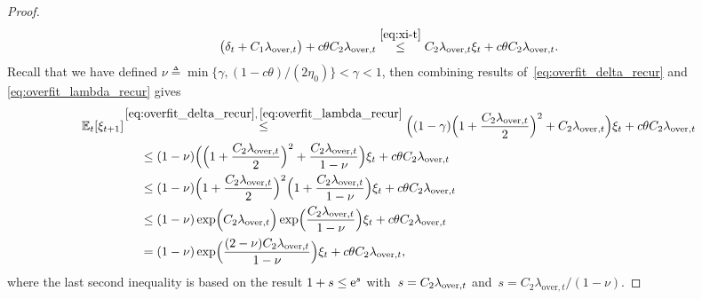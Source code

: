\documentclass[11pt]{article}
\theoremstyle{plain}
\theoremstyle{definition}
\theoremstyle{remark}
\theoremstyle{plain}
\begin{document}
\begin{proof}
\begin{align}
\begin{split}
\bigl(\delta_t+C_1\lambda_{\mathrm{over},t}\bigr)
+c\theta C_2\lambda_{\mathrm{over},t}  
 \overset{\eqref{eq:xi-t}}\leq C_2\lambda_{\mathrm{over},t}\xi_t
+c\theta C_2\lambda_{\mathrm{over},t}.
\end{split}
\end{align}
Recall that we have defined $\nu\triangleq\min\{\gamma,(1-c\theta)/(2\eta_0)\}<\gamma<1$, then combining results of~\eqref{eq:overfit_delta_recur} and \eqref{eq:overfit_lambda_recur} gives
\begin{subequations}
\begin{align}
\label{eq:xi_one_step_over_raw}
\mathbb E_t[\xi_{t+1}]
&\!\overset{\eqref{eq:overfit_delta_recur},\,\eqref{eq:overfit_lambda_recur}}{\leq}\Bigl((1-\gamma)
\Bigl(1+\frac{C_2\lambda_{\mathrm{over},t}}{2}\Bigr)^2
+C_2\lambda_{\mathrm{over},t}\Bigr)\xi_t
+c\theta C_2\lambda_{\mathrm{over},t}\\
\label{eq:xi_one_step_over}
&~~~~\leq (1-\nu)
\Bigl(\Bigl(1+\frac{C_2\lambda_{\mathrm{over},t}}{2}\Bigr)^2
+\frac{C_2\lambda_{\mathrm{over},t}}{1-\nu}\Bigr)\xi_t
+c\theta C_2\lambda_{\mathrm{over},t}\notag\\
&~~~~\leq (1-\nu)
\Bigl(1+\frac{C_2\lambda_{\mathrm{over},t}}{2}\Bigr)^2\Bigl(1
 + \frac{C_2\lambda_{\mathrm{over},t}}{1-\nu}\Bigr)\xi_t
 + c\theta C_2\lambda_{\mathrm{over},t}\notag\\
&~~~~\leq(1-\nu)\exp\Bigl(C_2\lambda_{\mathrm{over},t}\Bigr)
\exp\Bigl(\frac{C_2\lambda_{\mathrm{over},t}}{1-\nu}\Bigr)\xi_t
+c\theta C_2\lambda_{\mathrm{over},t}\notag\\
&~~~~=(1-\nu)
\exp\Bigl(\frac{(2-\nu)C_2\lambda_{\mathrm{over},t}}{1-\nu}
\Bigr)\xi_t
+c\theta C_2\lambda_{\mathrm{over},t},
\end{align}
\end{subequations}
where the last second inequality is based on the result $1+s\leq {\rm e}^s$ with~$s=C_2\lambda_{{\rm over},t}$
and~$s={C_2\lambda_{\mathrm{over},t}}/(1-\nu)$.



\end{proof}
\end{document}

